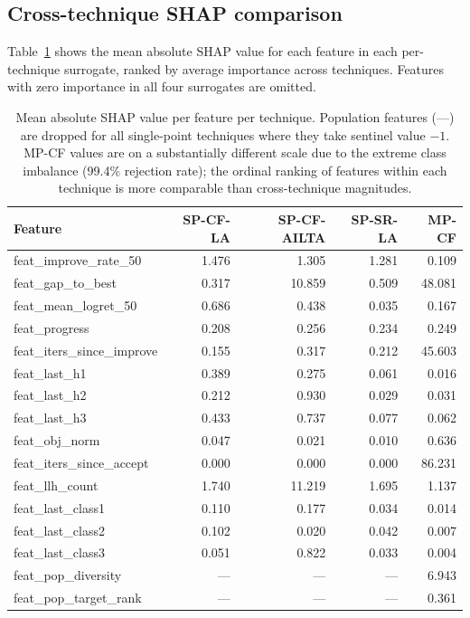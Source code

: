 \documentclass[11pt,a4paper]{article}
\begin{document}
\subsection{Cross-technique SHAP comparison}

Table~\ref{tab:shap} shows the mean absolute SHAP value for each feature in each
per-technique surrogate, ranked by average importance across techniques. Features
with zero importance in all four surrogates are omitted.

\begin{table}[h]
\centering
\small
\begin{tabular}{lrrrr}
\toprule
Feature & SP-CF-LA & SP-CF-AILTA & SP-SR-LA & MP-CF \\
\midrule
feat\_improve\_rate\_50    & 1.476 & 1.305 & 1.281 &  0.109 \\
feat\_gap\_to\_best        & 0.317 & 10.859 & 0.509 & 48.081 \\
feat\_mean\_logret\_50     & 0.686 & 0.438 & 0.035 &  0.167 \\
feat\_progress             & 0.208 & 0.256 & 0.234 &  0.249 \\
feat\_iters\_since\_improve & 0.155 & 0.317 & 0.212 & 45.603 \\
feat\_last\_h1             & 0.389 & 0.275 & 0.061 &  0.016 \\
feat\_last\_h2             & 0.212 & 0.930 & 0.029 &  0.031 \\
feat\_last\_h3             & 0.433 & 0.737 & 0.077 &  0.062 \\
feat\_obj\_norm            & 0.047 & 0.021 & 0.010 &  0.636 \\
feat\_iters\_since\_accept  & 0.000 & 0.000 & 0.000 & 86.231 \\
feat\_llh\_count           & 1.740 & 11.219 & 1.695 &  1.137 \\
feat\_last\_class1         & 0.110 & 0.177 & 0.034 &  0.014 \\
feat\_last\_class2         & 0.102 & 0.020 & 0.042 &  0.007 \\
feat\_last\_class3         & 0.051 & 0.822 & 0.033 &  0.004 \\
feat\_pop\_diversity       & --- & --- & --- & 6.943 \\
feat\_pop\_target\_rank    & --- & --- & --- & 0.361 \\
\bottomrule
\end{tabular}
\caption{Mean absolute SHAP value per feature per technique. Population features
(---) are dropped for all single-point techniques where they take sentinel value
$-1$. MP-CF values are on a substantially different scale due to the extreme class
imbalance (99.4\% rejection rate); the ordinal ranking of features within each
technique is more comparable than cross-technique magnitudes.}
\label{tab:shap}
\end{table}
\end{document}

